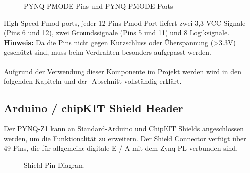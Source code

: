 \documentclass[a4paper]{report}
\begin{document}
		\begin{figure}[H]
			\centering
			\qquad
			\caption{PYNQ PMODE Pins und PYNQ PMODE Ports }
			\label{fig:PYNQ_PMODE_PYNQ_PMODE_Ports}
		\end{figure}


	
High-Speed Pmod ports, jeder 12 Pins Pmod-Port liefert zwei 3,3 VCC Signale (Pins 6 und 12), zwei Groundssignale (Pins 5 und 11) und 8 Logiksignale.\\

\textbf{Hinweis:} Da die Pins nicht gegen Kurzschluss oder Überspannung (>3.3V) geschützt sind, muss beim Verdrahten
besonders aufgepasst werden.\\\\
Aufgrund der Verwendung dieser Komponente  im Projekt werden wird in den folgenden Kapiteln und der \textbf{}-Abschnitt vollständig erklärt.


\subsection{Arduino / chipKIT Shield Header}
Der PYNQ-Z1 kann an Standard-Arduino und ChipKIT Shields angeschlossen werden, um die Funktionalität zu erweitern.
Der Shield Connector verfügt über 49 Pins, die für allgemeine digitale E / A mit dem Zynq PL verbunden sind.

	\begin{figure}[H]
	\centering
	\caption{Shield Pin Diagram}
	\label{fig:Shield_Pin_Diagram}
	\end{figure}
\end{document}
